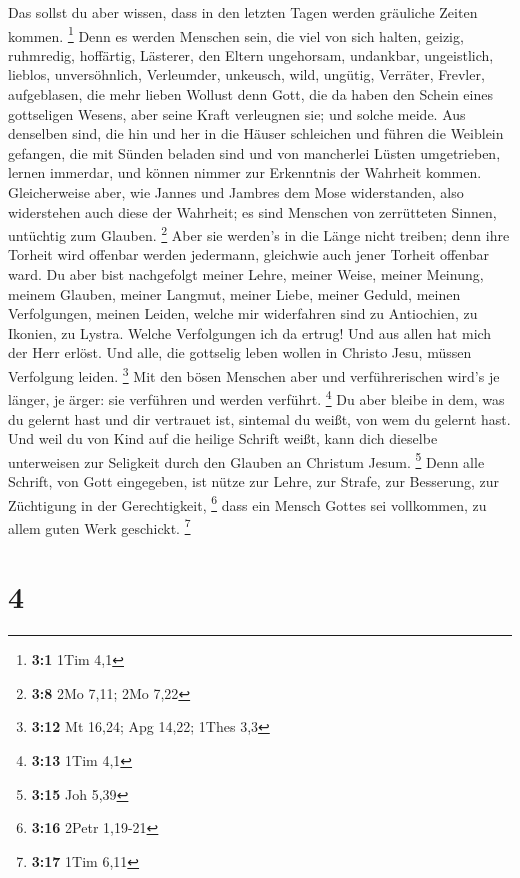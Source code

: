  Das sollst du aber wissen, dass in den letzten Tagen
werden gräuliche Zeiten kommen. \footnote{\textbf{3:1} 1Tim 4,1}
 Denn es werden Menschen sein, die viel von sich halten,
geizig, ruhmredig, hoffärtig, Lästerer, den Eltern ungehorsam,
undankbar, ungeistlich,  lieblos, unversöhnlich,
Verleumder, unkeusch, wild, ungütig,  Verräter, Frevler,
aufgeblasen, die mehr lieben Wollust denn Gott,  die da
haben den Schein eines gottseligen Wesens, aber seine Kraft verleugnen
sie; und solche meide.  Aus denselben sind, die hin und
her in die Häuser schleichen und führen die Weiblein gefangen, die mit
Sünden beladen sind und von mancherlei Lüsten umgetrieben,
 lernen immerdar, und können nimmer zur Erkenntnis der
Wahrheit kommen.  Gleicherweise aber, wie Jannes und
Jambres dem Mose widerstanden, also widerstehen auch diese der Wahrheit;
es sind Menschen von zerrütteten Sinnen, untüchtig zum Glauben.
\footnote{\textbf{3:8} 2Mo 7,11; 2Mo 7,22}  Aber sie
werden's in die Länge nicht treiben; denn ihre Torheit wird offenbar
werden jedermann, gleichwie auch jener Torheit offenbar ward.
 Du aber bist nachgefolgt meiner Lehre, meiner Weise,
meiner Meinung, meinem Glauben, meiner Langmut, meiner Liebe, meiner
Geduld,  meinen Verfolgungen, meinen Leiden, welche mir
widerfahren sind zu Antiochien, zu Ikonien, zu Lystra. Welche
Verfolgungen ich da ertrug! Und aus allen hat mich der Herr erlöst.
 Und alle, die gottselig leben wollen in Christo Jesu,
müssen Verfolgung leiden. \footnote{\textbf{3:12} Mt 16,24; Apg 14,22;
  1Thes 3,3}  Mit den bösen Menschen aber und
verführerischen wird's je länger, je ärger: sie verführen und werden
verführt. \footnote{\textbf{3:13} 1Tim 4,1}  Du aber
bleibe in dem, was du gelernt hast und dir vertrauet ist, sintemal du
weißt, von wem du gelernt hast.  Und weil du von Kind auf
die heilige Schrift weißt, kann dich dieselbe unterweisen zur Seligkeit
durch den Glauben an Christum Jesum. \footnote{\textbf{3:15} Joh 5,39}
 Denn alle Schrift, von Gott eingegeben, ist nütze zur
Lehre, zur Strafe, zur Besserung, zur Züchtigung in der Gerechtigkeit,
\footnote{\textbf{3:16} 2Petr 1,19-21}  dass ein Mensch
Gottes sei vollkommen, zu allem guten Werk geschickt. \footnote{\textbf{3:17}
  1Tim 6,11}

\hypertarget{section-3}{%
\section{4}\label{section-3}}

